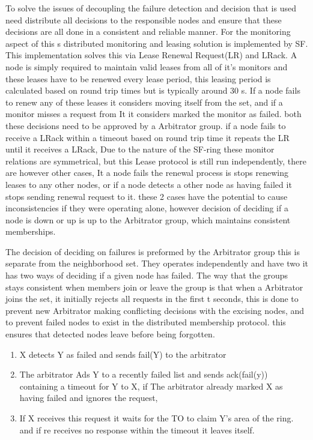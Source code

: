 \documentclass[a4paper,10pt,titlepage]{report}
\begin{document}
    To solve the issues of decoupling the failure detection and decision that is used need distribute all decisions to the responsible nodes and ensure that these decisions are all done in a consistent and reliable manner. For the monitoring aspect of this s distributed monitoring and leasing solution is implemented by SF. This implementation solves this via Lease Renewal Request(LR) and LRack. A node is simply required to maintain valid leases from all of it's monitors and these leases have to be renewed every lease period, this leasing period is calculated based on round trip times but is typically around 30 s. If a node fails to renew any of these leases it considers moving itself from the set, and if a monitor misses a request from It it considers marked the monitor as failed. both these decisions need to be approved by a Arbitrator group. if a node fails to receive a LRack within a timeout based on round trip time it repeats the LR until it receives a LRack, Due to the nature of the SF-ring these monitor relations are symmetrical, but this Lease protocol is still run independently, there are however other cases, It a node fails the renewal process is stops renewing leases to any other nodes, or if a node detects a other node as having failed it stops sending renewal request to it. these 2 cases have the potential to cause inconsistencies if they were operating alone, however decision of deciding if a node is down or up is up to the Arbitrator group, which maintains consistent memberships. \\
    \vspace{5mm}

    The decision of deciding on failures is preformed by the Arbitrator group this is separate from the neighborhood set. They operates independently and have two it has two ways of deciding if a given node has failed. The way that the groups stays consistent when members join or leave the group is that when a Arbitrator joins the set, it initially rejects all requests in the first t seconds, this is done to prevent new Arbitrator making conflicting decisions with the excising nodes, and to prevent failed nodes to exist in the distributed membership protocol. this ensures that detected nodes leave before being forgotten.\\
    \vspace{5mm}

    \begin{enumerate}
        \item X detects Y as failed and sends fail(Y) to the arbitrator
        \item The arbitrator Ads Y to a recently failed list and sends ack(fail(y)) containing a timeout for Y to X, if The arbitrator already marked X as having failed and ignores the request,
        \item If X receives this request it waits for the TO to claim Y's area of the ring. and if re receives no response within the timeout it leaves itself.
    \end{enumerate}
\end{document}
